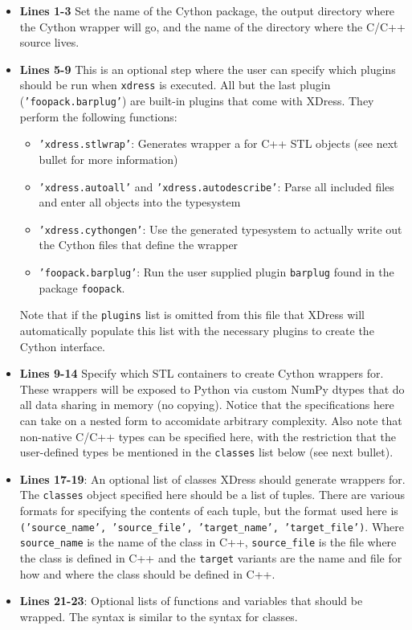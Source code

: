     \begin{itemize}
      \item \textbf{Lines 1-3} Set the name of the Cython package, the output directory where the Cython wrapper will go, and the name of the directory where the C/C++ source lives.
      \item \textbf{Lines 5-9} This is an optional step where the user can specify which plugins should be run when \texttt{xdress} is executed. All but the last plugin (\texttt{'foopack.barplug'}) are built-in plugins that come with XDress.  They perform the following functions:
      \begin{itemize}
        \item \texttt{'xdress.stlwrap'}: Generates wrapper a for C++ STL objects (see next bullet for more information)
        \item \texttt{'xdress.autoall'} and \texttt{'xdress.autodescribe'}: Parse all included files and enter all objects into the typesystem
        \item \texttt{'xdress.cythongen'}: Use the generated typesystem to actually write out the Cython files that define the wrapper
        \item \texttt{'foopack.barplug'}: Run the user supplied plugin \texttt{barplug} found in the package \texttt{foopack}.
      \end{itemize}
      Note that if the \texttt{plugins} list is omitted from this file that XDress will automatically populate this list with the necessary plugins to create the Cython interface.
      \item \textbf{Lines 9-14} Specify which STL containers to create Cython wrappers for. These wrappers will be exposed to Python via custom NumPy dtypes that do all data sharing in memory (no copying). Notice that the specifications here can take on a nested form to accomidate arbitrary complexity. Also note that non-native C/C++ types can be specified here, with the restriction that the user-defined types be mentioned in the \texttt{classes} list below (see next bullet).
      \item \textbf{Lines 17-19}: An optional list of classes XDress should generate wrappers for. The \texttt{classes} object specified here should be a list of tuples. There are various formats for specifying the contents of each tuple, but the format used here is \texttt{('source\_name', 'source\_file', 'target\_name', 'target\_file')}. Where \texttt{source\_name} is the name of the class in C++, \texttt{source\_file} is the file where the class is defined in C++ and the \texttt{target} variants are the name and file for how and where the class should be defined in C++.
      \item \textbf{Lines 21-23}: Optional lists of functions and variables that should be wrapped. The syntax is similar to the syntax for classes.
    \end{itemize}
    \mainstretch{}

